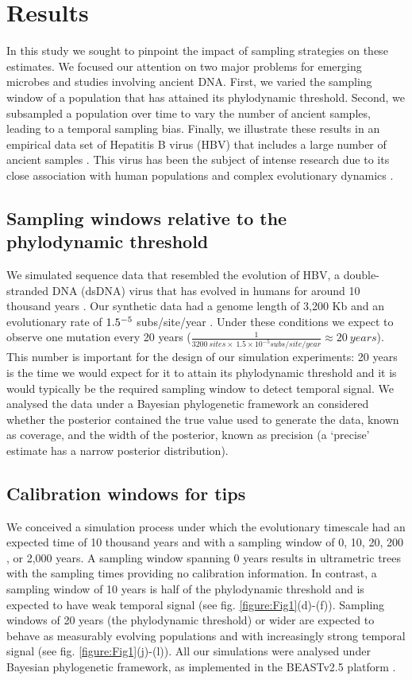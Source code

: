 \documentclass[11pt]{article}
\begin{document}
\section{Results}
In this study we sought to pinpoint the impact of sampling strategies on these estimates. We focused our attention on two major problems for emerging microbes and studies involving ancient DNA. First, we varied the sampling window of a population that has attained its phylodynamic threshold. Second, we subsampled a population over time to vary the number of ancient samples, leading to a temporal sampling bias. Finally, we illustrate these results in an empirical data set of Hepatitis B virus (HBV) that includes a large number of ancient samples \citep{kocher2021ten}. This virus has been the subject of intense research due to its close association with human populations and complex evolutionary dynamics \citep{paraskevis2013dating, ross2018paradox, kahila2012tracing}.

\subsection{Sampling windows relative to the phylodynamic threshold}
We simulated sequence data that resembled the evolution of HBV, a double-stranded DNA (dsDNA) virus that has evolved in humans for around 10 thousand years \citep{kocher2021ten}. Our synthetic data had a genome length of 3,200 Kb and an evolutionary rate of $1.5\time10^{-5}$ subs/site/year \citep{kocher2021ten, muhlemann2018ancient}. Under these conditions we expect to observe one mutation every 20 years ($\frac{1}{3200\ sites \times\ 1.5\times10^{-5}subs/site/year}\approx20\ years$). This number is important for the design of our simulation experiments: 20 years is the time we would expect for it to attain its phylodynamic threshold and it is would typically be the required sampling window to detect temporal signal. We analysed the data under a Bayesian phylogenetic framework an considered whether the posterior contained the true value used to generate the data, known as coverage, and the width of the posterior, known as precision (a `precise' estimate has a narrow posterior distribution).

\subsection{Calibration windows for tips}
We conceived a simulation process under which the evolutionary timescale had an expected time of 10 thousand years and with a sampling window of 0, 10, 20, 200 , or 2,000 years. A sampling window spanning 0 years results in ultrametric trees with the sampling times providing no calibration information. In contrast, a sampling window of 10 years is half of the phylodynamic threshold and is expected to have weak temporal signal (see fig. \ref{figure:Fig1}(d)-(f)). Sampling windows of 20 years (the phylodynamic threshold) or wider are expected to behave as measurably evolving populations and with increasingly strong temporal signal (see fig. \ref{figure:Fig1}(j)-(l)). All our simulations were analysed under Bayesian phylogenetic framework, as implemented in the BEASTv2.5 platform \citep{bouckaert2019beast}.
\end{document}
